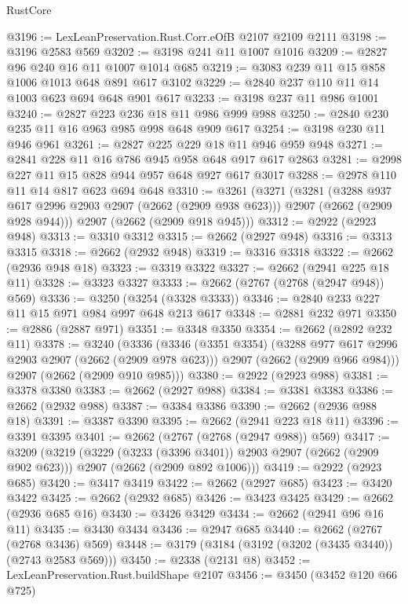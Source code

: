 \begin{lexlean}{RustCore}
\begin{coremodule}
@3196 := LexLeanPreservation.Rust.Corr.eOfB @2107 @2109 @2111
@3198 := @3196 @2583 @569
@3202 := @3198 @241 @11 @1007 @1016
@3209 := @2827 @96 @240 @16 @11 @1007 @1014 @685
@3219 := @3083 @239 @11 @15 @858 @1006 @1013 @648 @891 @617 @3102
@3229 := @2840 @237 @110 @11 @14 @1003 @623 @694 @648 @901 @617
@3233 := @3198 @237 @11 @986 @1001
@3240 := @2827 @223 @236 @18 @11 @986 @999 @988
@3250 := @2840 @230 @235 @11 @16 @963 @985 @998 @648 @909 @617
@3254 := @3198 @230 @11 @946 @961
@3261 := @2827 @225 @229 @18 @11 @946 @959 @948
@3271 := @2841 @228 @11 @16 @786 @945 @958 @648 @917 @617 @2863
@3281 := @2998 @227 @11 @15 @828 @944 @957 @648 @927 @617 @3017
@3288 := @2978 @110 @11 @14 @817 @623 @694 @648
@3310 := @3261
    (@3271
      (@3281
        (@3288 @937 @617 @2996 @2903 @2907 (@2662 (@2909 @938 @623)))
        @2907
        (@2662 (@2909 @928 @944)))
      @2907
      (@2662 (@2909 @918 @945)))
@3312 := @2922 (@2923 @948)
@3313 := @3310 @3312
@3315 := @2662 (@2927 @948)
@3316 := @3313 @3315
@3318 := @2662 (@2932 @948)
@3319 := @3316 @3318
@3322 := @2662 (@2936 @948 @18)
@3323 := @3319 @3322
@3327 := @2662 (@2941 @225 @18 @11)
@3328 := @3323 @3327
@3333 := @2662 (@2767 (@2768 (@2947 @948)) @569)
@3336 := @3250 (@3254 (@3328 @3333))
@3346 := @2840 @233 @227 @11 @15 @971 @984 @997 @648 @213 @617
@3348 := @2881 @232 @971
@3350 := @2886 (@2887 @971)
@3351 := @3348 @3350
@3354 := @2662 (@2892 @232 @11)
@3378 := @3240
    (@3336
      (@3346
        (@3351 @3354)
        (@3288 @977 @617 @2996 @2903 @2907 (@2662 (@2909 @978 @623)))
        @2907
        (@2662 (@2909 @966 @984)))
      @2907
      (@2662 (@2909 @910 @985)))
@3380 := @2922 (@2923 @988)
@3381 := @3378 @3380
@3383 := @2662 (@2927 @988)
@3384 := @3381 @3383
@3386 := @2662 (@2932 @988)
@3387 := @3384 @3386
@3390 := @2662 (@2936 @988 @18)
@3391 := @3387 @3390
@3395 := @2662 (@2941 @223 @18 @11)
@3396 := @3391 @3395
@3401 := @2662 (@2767 (@2768 (@2947 @988)) @569)
@3417 := @3209
    (@3219
      (@3229 (@3233 (@3396 @3401)) @2903 @2907 (@2662 (@2909 @902 @623)))
      @2907
      (@2662 (@2909 @892 @1006)))
@3419 := @2922 (@2923 @685)
@3420 := @3417 @3419
@3422 := @2662 (@2927 @685)
@3423 := @3420 @3422
@3425 := @2662 (@2932 @685)
@3426 := @3423 @3425
@3429 := @2662 (@2936 @685 @16)
@3430 := @3426 @3429
@3434 := @2662 (@2941 @96 @16 @11)
@3435 := @3430 @3434
@3436 := @2947 @685
@3440 := @2662 (@2767 (@2768 @3436) @569)
@3448 := @3179 (@3184 (@3192 (@3202 (@3435 @3440)) (@2743 @2583 @569)))
@3450 := @2338 (@2131 @8)
@3452 := LexLeanPreservation.Rust.buildShape @2107
@3456 := @3450 (@3452 @120 @66 @725)

\end{coremodule}
\end{lexlean}
